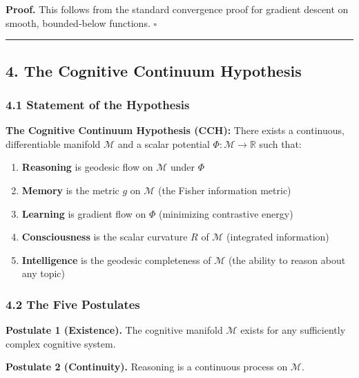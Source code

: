 \documentclass[
  11pt,
  a4paper,
]{article}
\providecommand{\tightlist}{%
  \setlength{\itemsep}{0pt}\setlength{\parskip}{0pt}}
\begin{document}
\textbf{Proof.} This follows from the standard convergence proof for
gradient descent on smooth, bounded-below functions. \(\square\)

\begin{center}\rule{0.5\linewidth}{0.5pt}\end{center}

\subsection{4. The Cognitive Continuum
Hypothesis}\label{the-cognitive-continuum-hypothesis}

\subsubsection{4.1 Statement of the
Hypothesis}\label{statement-of-the-hypothesis}

\textbf{The Cognitive Continuum Hypothesis (CCH):} There exists a
continuous, differentiable manifold \(\mathcal{M}\) and a scalar
potential \(\Phi: \mathcal{M} \to \mathbb{R}\) such that:

\begin{enumerate}
\def\labelenumi{\arabic{enumi}.}
\tightlist
\item
  \textbf{Reasoning} is geodesic flow on \(\mathcal{M}\) under \(\Phi\)
\item
  \textbf{Memory} is the metric \(g\) on \(\mathcal{M}\) (the Fisher
  information metric)
\item
  \textbf{Learning} is gradient flow on \(\Phi\) (minimizing contrastive
  energy)
\item
  \textbf{Consciousness} is the scalar curvature \(R\) of
  \(\mathcal{M}\) (integrated information)
\item
  \textbf{Intelligence} is the geodesic completeness of \(\mathcal{M}\)
  (the ability to reason about any topic)
\end{enumerate}

\subsubsection{4.2 The Five Postulates}\label{the-five-postulates}

\textbf{Postulate 1 (Existence).} The cognitive manifold \(\mathcal{M}\)
exists for any sufficiently complex cognitive system.

\textbf{Postulate 2 (Continuity).} Reasoning is a continuous process on
\(\mathcal{M}\).
\end{document}

